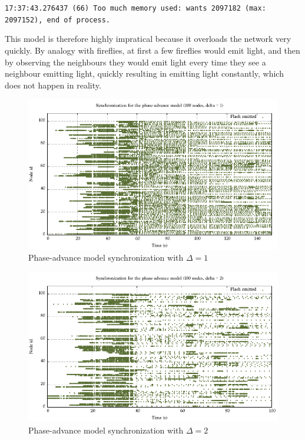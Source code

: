 \documentclass[a4paper, 11pt]{article}
\theoremstyle{plain}
\theoremstyle{definition}
\begin{document}
     \begin{displayquote}
       \texttt{17:37:43.276437 (66)  Too much memory used: wants 2097182 (max: 2097152), end of process.}
     \end{displayquote}

     This model is therefore highly impratical because it overloads the network very quickly. By analogy with
     fireflies, at first a few fireflies would emit light, and then by observing the neighbours they would
     emit light every time they see a neighbour emitting light, quickly resulting in emitting light constantly, which
     does not happen in reality. 

     \begin{figure}[h]
       \centering
       \includegraphics[scale=0.8]{../Plots/Firefly-pa-100nodes-1-9.pdf}
       \caption{Phase-advance model synchronization with $\Delta = 1$}
       \label{fig:pa-sync-d1}
     \end{figure}

     \begin{figure}[h]
       \centering
       \includegraphics[scale=0.8]{../Plots/Firefly-pa-100nodes-2-6.pdf}
       \caption{Phase-advance model synchronization with $\Delta = 2$}
       \label{fig:pa-sync-d2}
     \end{figure}
\end{document}
